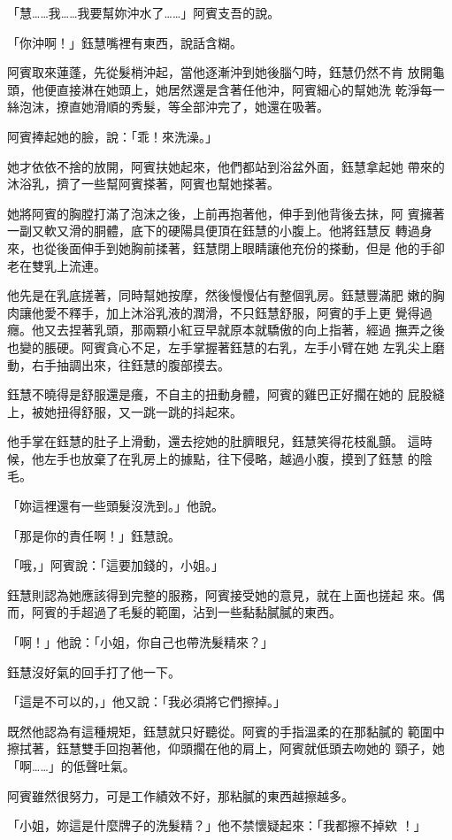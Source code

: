 「慧……我……我要幫妳沖水了……」阿賓支吾的說。

「你沖啊！」鈺慧嘴裡有東西，說話含糊。

阿賓取來蓮蓬，先從髮梢沖起，當他逐漸沖到她後腦勺時，鈺慧仍然不肯
放開龜頭，他便直接淋在她頭上，她居然還是含著任他沖，阿賓細心的幫她洗
乾淨每一絲泡沫，撩直她滑順的秀髮，等全部沖完了，她還在吸著。

阿賓捧起她的臉，說：「乖！來洗澡。」

她才依依不捨的放開，阿賓扶她起來，他們都站到浴盆外面，鈺慧拿起她
帶來的沐浴乳，擠了一些幫阿賓搽著，阿賓也幫她搽著。

她將阿賓的胸膛打滿了泡沫之後，上前再抱著他，伸手到他背後去抹，阿
賓擁著一副又軟又滑的胴體，底下的硬陽具便頂在鈺慧的小腹上。他將鈺慧反
轉過身來，也從後面伸手到她胸前揉著，鈺慧閉上眼睛讓他充份的搽動，但是
他的手卻老在雙乳上流連。

他先是在乳底搓著，同時幫她按摩，然後慢慢佔有整個乳房。鈺慧豐滿肥
嫩的胸肉讓他愛不釋手，加上沐浴乳液的潤滑，不只鈺慧舒服，阿賓的手上更
覺得過癮。他又去捏著乳頭，那兩顆小紅豆早就原本就驕傲的向上指著，經過
撫弄之後也變的脹硬。阿賓貪心不足，左手掌握著鈺慧的右乳，左手小臂在她
左乳尖上磨動，右手抽調出來，往鈺慧的腹部摸去。

鈺慧不曉得是舒服還是癢，不自主的扭動身體，阿賓的雞巴正好擱在她的
屁股縫上，被她扭得舒服，又一跳一跳的抖起來。

他手掌在鈺慧的肚子上滑動，還去挖她的肚臍眼兒，鈺慧笑得花枝亂顫。
這時候，他左手也放棄了在乳房上的據點，往下侵略，越過小腹，摸到了鈺慧
的陰毛。

「妳這裡還有一些頭髮沒洗到。」他說。

「那是你的責任啊！」鈺慧說。

「哦，」阿賓說：「這要加錢的，小姐。」

鈺慧則認為她應該得到完整的服務，阿賓接受她的意見，就在上面也搓起
來。偶而，阿賓的手超過了毛髮的範圍，沾到一些黏黏膩膩的東西。

「啊！」他說：「小姐，你自己也帶洗髮精來？」

鈺慧沒好氣的回手打了他一下。

「這是不可以的，」他又說：「我必須將它們擦掉。」

既然他認為有這種規矩，鈺慧就只好聽從。阿賓的手指溫柔的在那黏膩的
範圍中擦拭著，鈺慧雙手回抱著他，仰頭擱在他的肩上，阿賓就低頭去吻她的
頸子，她「啊……」的低聲吐氣。

阿賓雖然很努力，可是工作績效不好，那粘膩的東西越擦越多。

「小姐，妳這是什麼牌子的洗髮精？」他不禁懷疑起來：「我都擦不掉欸
！」

